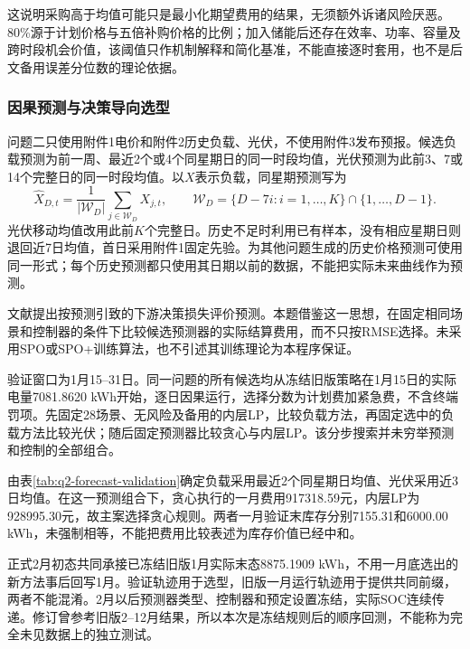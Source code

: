 这说明采购高于均值可能只是最小化期望费用的结果，无须额外诉诸风险厌恶。80\%源于计划价格与五倍补购价格的比例；加入储能后还存在效率、功率、容量及跨时段机会价值，该阈值只作机制解释和简化基准，不能直接逐时套用，也不是后文备用误差分位数的理论依据。

\subsubsection{因果预测与决策导向选型}

问题二只使用附件1电价和附件2历史负载、光伏，不使用附件3发布预报。候选负载预测为前一周、最近2个或4个同星期日的同一时段均值，光伏预测为此前3、7或14个完整日的同一时段均值。以$X$表示负载，同星期预测写为
\begin{equation}
 \widehat X_{D,t}=\frac{1}{|\mathcal W_D|}\sum_{j\in\mathcal W_D}X_{j,t},\qquad
 \mathcal W_D=\{D-7i:i=1,\ldots,K\}\cap\{1,\ldots,D-1\}.
 \label{eq:weekday_forecast}
\end{equation}
光伏移动均值改用此前$K$个完整日。历史不足时利用已有样本，没有相应星期日则退回近7日均值，首日采用附件1固定先验。为其他问题生成的历史价格预测可使用同一形式；每个历史预测都只使用其日期以前的数据，不能把实际未来曲线作为预测。

文献\cite{elmachtoub2017spo}提出按预测引致的下游决策损失评价预测。本题借鉴这一思想，在固定相同场景和控制器的条件下比较候选预测器的实际结算费用，而不只按RMSE选择。未采用SPO或SPO+训练算法，也不引述其训练理论为本程序保证。

验证窗口为1月15--31日。同一问题的所有候选均从冻结旧版策略在1月15日的实际电量7081.8620 kWh开始，逐日因果运行，选择分数为计划费加紧急费，不含终端罚项。先固定28场景、无风险及备用的内层LP，比较负载方法，再固定选中的负载方法比较光伏；随后固定预测器比较贪心与内层LP。该分步搜索并未穷举预测和控制的全部组合。



由表\ref{tab:q2-forecast-validation}确定负载采用最近2个同星期日均值、光伏采用近3日均值。在这一预测组合下，贪心执行的一月费用917318.59元，内层LP为928995.30元，故主案选择贪心规则。两者一月验证末库存分别7155.31和6000.00 kWh，未强制相等，不能把费用比较表述为库存价值已经中和。

正式2月初态共同承接已冻结旧版1月实际末态8875.1909 kWh，不用一月底选出的新方法事后回写1月。验证轨迹用于选型，旧版一月运行轨迹用于提供共同前缀，两者不能混淆。2月以后预测器类型、控制器和预定设置冻结，实际SOC连续传递。修订曾参考旧版2--12月结果，所以本次是冻结规则后的顺序回测，不能称为完全未见数据上的独立测试。

